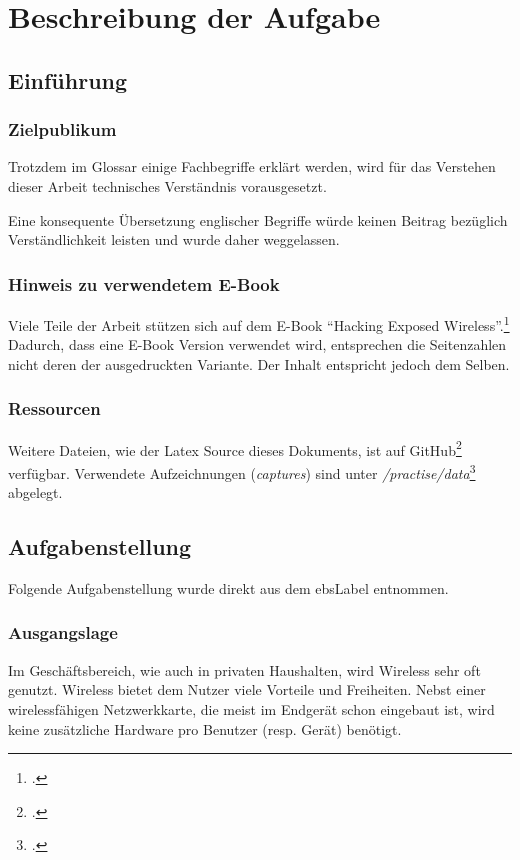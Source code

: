 \chapter{Beschreibung der Aufgabe}

\section{Einführung}
\subsection{Zielpublikum}
Trotzdem im Glossar einige Fachbegriffe erklärt werden, wird für das Verstehen dieser Arbeit technisches Verständnis vorausgesetzt.

Eine konsequente Übersetzung englischer Begriffe würde keinen Beitrag bezüglich Verständlichkeit leisten und wurde daher weggelassen.

\subsection{Hinweis zu verwendetem E-Book}
Viele Teile der Arbeit stützen sich auf dem E-Book "`Hacking Exposed Wireless"'.\footcite{WrightCache201503}
Dadurch, dass eine E-Book Version verwendet wird, entsprechen die Seitenzahlen nicht deren der ausgedruckten Variante.
Der Inhalt entspricht jedoch dem Selben.

\subsection{Ressourcen}
Weitere Dateien, wie der Latex Source dieses Dokuments, ist auf GitHub\footcite{GitHub_wlan_seminar_2015-04-16} verfügbar.
Verwendete Aufzeichnungen (\textit{captures}) sind unter \textit{/practise/data}\footcite{GitHub_wlan_seminar_practise_data_2015-04-16} abgelegt.

\section{Aufgabenstellung}
Folgende Aufgabenstellung wurde direkt aus dem \gls{ebsLabel} entnommen.

\subsection{Ausgangslage}
Im Geschäftsbereich, wie auch in privaten Haushalten, wird Wireless sehr oft genutzt.
Wireless bietet dem Nutzer viele Vorteile und Freiheiten. Nebst einer wirelessfähigen Netzwerkkarte, die meist im Endgerät schon eingebaut ist, wird keine zusätzliche Hardware pro Benutzer (resp. Gerät) benötigt.

